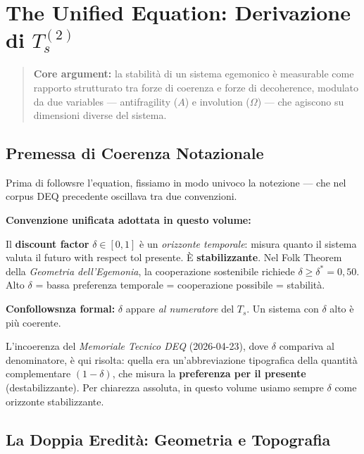 \chapter{\texorpdfstring{The Unified Equation: Derivazione di
\(T_s^{(2)}\)}{The Unified Equation: Derivazione di T\_s\^{}\{(2)\}}}\label{lequation-unificata-followszione-di-t_s2}

\begin{quote}
\textbf{Core argument:} la stabilità di un sistema egemonico è
measurable come rapporto strutturato tra forze di coerenza e forze di
decoherence, modulato da due variables --- antifragility (\(A\)) e
involution (\(\Omega\)) --- che agiscono su dimensioni diverse del
sistema.
\end{quote}



\section{Premessa di Coerenza
Notazionale}\label{premessa-di-coerenza-notezionale}

Prima di followsre l'equation, fissiamo in modo univoco la notezione ---
che nel corpus DEQ precedente oscillava tra due convenzioni.

\Hypoth{} \textbf{Convenzione unificata adottata in questo volume:}

Il \textbf{discount factor} \(\delta \in [0, 1]\) è un \emph{orizzonte
temporale}: misura quanto il sistema valuta il futuro with respect tol
presente. È \textbf{stabilizzante}. Nel Folk Theorem della
\emph{Geometria dell'Egemonia}, la cooperazione sostenibile richiede
\(\delta \geq \delta^* = 0{,}50\). Alto \(\delta\) = bassa preferenza
temporale = cooperazione possibile = stabilità.

\Proved{} \textbf{Confollowsnza formal:} \(\delta\) appare \emph{al
numeratore} del \(T_s\). Un sistema con \(\delta\) alto è più coerente.

L'incoerenza del \emph{Memoriale Tecnico DEQ} (2026-04-23), dove
\(\delta\) compariva al denominatore, è qui risolta: quella era
un'abbreviazione tipografica della quantità complementare
\((1-\delta)\), che misura la \textbf{preferenza per il presente}
(destabilizzante). Per chiarezza assoluta, in questo volume usiamo
sempre \(\delta\) come orizzonte stabilizzante.



\section{La Doppia Eredità: Geometria e
Topografia}\label{la-doppia-eredituxe0-geometria-e-topografia}

